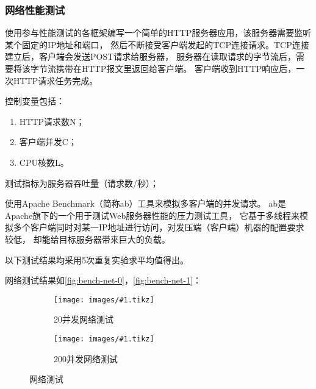 \documentclass[supercite]{HustGraduPaper}
\newcommand{\cfig}[3]{
  \begin{figure}[htb]
    \centering
    \texttt{[image: images/\#1.tikz]}
    \caption{#3}
    \label{fig:#1}
  \end{figure}
}
\newcommand{\sfig}[3]{
  \begin{subfigure}[b]{#2\textwidth}
    \texttt{[image: images/\#1.tikz]}
    \caption{#3}
    \label{fig:#1}
  \end{subfigure}
}
\newcommand{\xfig}[3]{
  \begin{figure}[htb]
    \centering
    #3
    \caption{#2}
    \label{fig:#1}
  \end{figure}
}
\newcommand{\rfig}[1]{\autoref{fig:#1}}
\theoremstyle{definition}
\begin{document}
\subsubsection{网络性能测试}


使用参与性能测试的各框架编写一个简单的HTTP服务器应用，该服务器需要监听某个固定的IP地址和端口，
然后不断接受客户端发起的TCP连接请求。TCP连接建立后，客户端会发送POST请求给服务器，
服务器在读取请求的字节流后，需要将该字节流携带在HTTP报文里返回给客户端。
客户端收到HTTP响应后，一次HTTP请求任务完成。\par

控制变量包括：

\begin{enumerate}[label={(\arabic*)}]
  \item HTTP请求数N；
  \item 客户端并发C；
  \item CPU核数L。
\end{enumerate}

测试指标为服务器吞吐量（请求数/秒）；

使用Apache Benchmark（简称ab）工具来模拟多客户端的并发请求。
ab是Apache旗下的一个用于测试Web服务器性能的压力测试工具，
它基于多线程来模拟多个客户端同时对某一IP地址进行访问，对发压端（客户端）机器的配置要求较低，
却能给目标服务器带来巨大的负载。\par

以下测试结果均采用5次重复实验求平均值得出。\par

网络测试结果如\rfig{bench-net-0}，\rfig{bench-net-1}：\par

%

\xfig{bench-net}{网络测试}{
  \sfig{bench-net-0}{0.4}{20并发网络测试}
  \sfig{bench-net-1}{0.4}{200并发网络测试}
}

\end{document}
